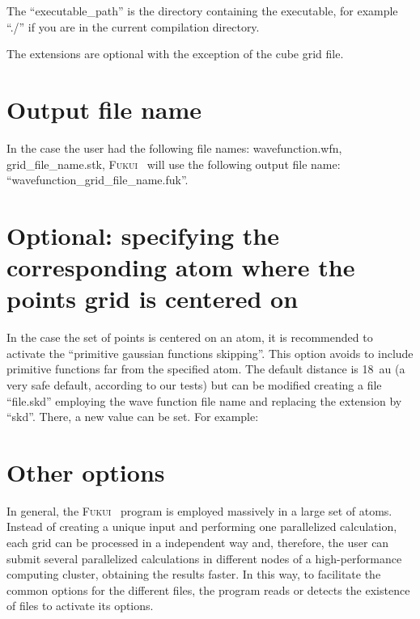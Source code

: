 \documentclass[a4paper,11pt,openany]{memoir}
\newcommand\programa{\textsc{Fukui}}
\begin{document}
The ``executable\_path'' is the directory containing the executable, for example ``./'' if you are in the current compilation directory.

The extensions are optional with the exception of the cube grid file.

\section{Output file name}
In the case the user had the following file names: wavefunction.wfn, grid\_file\_name.stk, \programa~ will use the following output file name: ``wavefunction\_grid\_file\_name.fuk''.

\section{Optional: specifying the corresponding atom where the points grid is centered on}\label{sec:gauss.skip}
In the case the set of points is centered on an atom, it is recommended to activate the ``primitive gaussian functions skipping''. This option avoids to include primitive functions far from the specified atom. The default distance is \SI{18}{au} (a very safe default, according to our tests) but can be modified creating a file ``file.skd'' employing the wave function file name and replacing the extension by ``skd''. There, a new value can be set. For example:

\section{Other options}
In general, the \programa~ program is employed massively in a large set of atoms. Instead of creating a unique input and performing one parallelized calculation, each grid can be processed in a independent way and, therefore, the user can submit several parallelized calculations in different nodes of a high-performance computing cluster, obtaining the results faster. In this way, to facilitate the common options for the different files, the program reads or detects the existence of files to activate its options.
\end{document}
